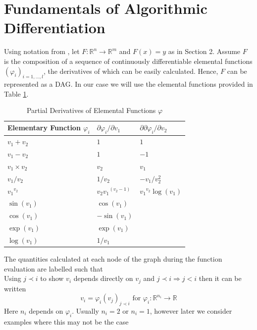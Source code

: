 \documentclass{article}
\begin{document}
\section{Fundamentals of Algorithmic Differentiation}

Using notation from \cite{evald}, let $F: \mathbb{R}^n \rightarrow \mathbb{R}^m$ and $F(x) = y$ as in Section 2. Assume $F$ is the composition of a sequence of continuously differentiable elemental functions $(\varphi_i)_{i=1,\ldots, l}$, the derivatives of which can be easily calculated. Hence, $F$ can be represented as a DAG. In our case we will use the elemental functions provided in Table \ref{tab:elemental}.

\begin{table}[h]
    \centering
    \begin{tabular}{|lll|}
        \hline
        Elementary Function $\varphi_i$ & $\partial \varphi_i / \partial {v}_1$ & $\partial \partial \varphi_i / \partial {v}_2$ \\
        \hline
        $v_1+v_2$ & $1$ & $1$ \\
        $v_1-v_2$ & $1$ & $-1$ \\
        $v_1 \times v_2$ & $v_2$ & $v_1$ \\
        $v_1 / v_2$ & $1/v_2$ & $-v_1/v_2^2$ \\
        ${v_1}^{v_2}$ & $v_2{v_1}^{(v_2-1)}$ & ${v_1}^{v_2}\log(v_1)$ \\
        \hdashline
        $\sin(v_1)$ & $\cos(v_1)$ & \\
        $\cos(v_1)$ & $-\sin(v_1)$ & \\
        $\exp(v_1)$ & $\exp(v_1)$ & \\
        $\log(v_1)$ & $1/v_1$ & \\
        \hline
    \end{tabular}
    \caption{Partial Derivatives of Elemental Functions $\varphi$}
    \label{tab:elemental}
\end{table}

The quantities calculated at each node of the graph during the function evaluation are labelled such that
\begin{equation}
    [ \underbrace{v_{1-n}, \ldots, v_0}_{x} , v_1, \ldots, v_{l-m}, \underbrace{v_{l-m+1}, \ldots, v_l}_{y}]
\end{equation}
Using $j \prec i$ to show $v_i$ depends directly on $v_j$ and $j \prec i \Longrightarrow j < i$ then it can be written
\begin{equation}
    v_i = \varphi_i (v_j)_{j \prec i} \text{ for } \varphi_i : \mathbb{R}^{n_i} \longrightarrow \mathbb{R}
\end{equation}
Here $n_i$ depends on $\varphi_i$. Usually $n_i=2$ or $n_i=1$, however later we consider examples where this may not be the case
\end{document}
